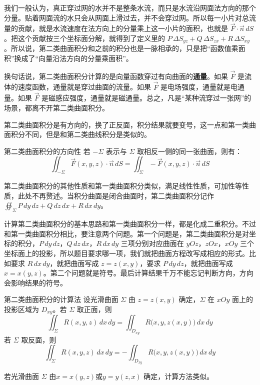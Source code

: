 我们一般认为，真正穿过网的水并不是整条水流，而只是水流沿网面法方向的那个分量。贴着网面流的水只会从网面上滑过去，并不会穿过网。所以每一小片对总流量的贡献，就是水流速度在法方向上的分量乘上这一小片的面积，也就是 \(\vec{F}\cdot\vec{n}\,dS\)。把这个贡献按三个坐标面分解，就得到了定义里的 \(P\,\Delta S_{yz} + Q\,\Delta S_{zx} + R\,\Delta S_{xy}\)。所以说，第二类曲面积分和之前的积分也是一脉相承的，只是把“函数值乘面积”换成了“向量沿法方向的分量乘面积”。

换句话说，第二类曲面积分计算的是向量函数穿过有向曲面的\textbf{通量}。如果 \(\vec{F}\) 是流体的速度函数，通量就是穿过曲面的流量。如果 \(\vec{F}\) 是电场强度，通量就是电通量。如果 \(\vec{F}\) 是磁感应强度，通量就是磁通量。总之，凡是“某种流穿过一张网”的场景，都离不开第二类曲面积分。

第二类曲面积分是有方向的，换了正反面，积分结果就要变号，这一点和第一类曲面积分不同，但是和第二类曲线积分是类似的。

\begin{theorem}{第二类曲面积分的方向性}{}
    若 \(-\Sigma\) 表示与 \(\Sigma\) 取相反一侧的同一张曲面，则有：
    \[\iint_{-\Sigma} \vec{F}(x,y,z) \cdot \vec{n}\,dS = \iint_{\Sigma} -\vec{F}(x,y,z) \cdot \vec{n}\,dS\]
\end{theorem}

第二类曲面积分的其他性质和第一类曲面积分类似，满足线性性质，可加性等性质，此处不再赘述。当积分曲面是闭合曲面时，第二类曲面积分记作 \(\oiint_{\Sigma} P\,dy\,dz + Q\,dz\,dx + R\,dx\,dy\)。

计算第二类曲面积分的基本思路和第一类曲面积分一样，都是化成二重积分。不过和第一类曲面积分相比，要注意两个问题。第一个问题是，第二类曲面积分是对坐标的积分，\(P\,dy\,dz\)，\(Q\,dz\,dx\)，\(R\,dx\,dy\) 三项分别对应曲面在 \(yOz\)，\(zOx\)，\(xOy\) 三个坐标面上的投影，所以题目要求哪一项，我们就把曲面方程改写成相应的形式。比如要求 \(R\,dx\,dy\)，就把曲面写成 \(z=z(x,y)\)，要求 \(P\,dy\,dz\)，就把曲面写成 \(x=x(y,z)\)。第二个问题就是符号。最后计算结果千万不能忘记判断方向，方向会影响结果的符号。

\begin{theorem}{第二类曲面积分的计算法}{}
    设光滑曲面 \(\Sigma\) 由 \(z = z(x,y)\) 确定，\(\Sigma\) 在 \(xOy\) 面上的投影区域为 \(D_{xy}\)。若 \(\Sigma\) 取正面，则
\[
\iint_{\Sigma} R(x,y,z)\,dx\,dy = \iint_{D_{xy}} R\big(x,y,z(x,y)\big)\,dx\,dy
\]
若 \(\Sigma\) 取反面，则
\[
\iint_{\Sigma} R(x,y,z)\,dx\,dy = -\iint_{D_{xy}} R\big(x,y,z(x,y)\big)\,dx\,dy
\]

若光滑曲面 \(\Sigma\) 由\(x = x(y,z)\)或\(y = y(z,x)\) 确定，计算方法类似。
\end{theorem}

